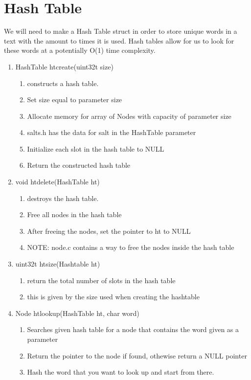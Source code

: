 \documentclass[11pt]{article}
\begin{document}
\section{Hash Table}\label{ss:Hashtable}
We will need to make a Hash Table struct in order to store unique words in a text with the amount to times it is used. Hash tables allow for us to look for these words at a potentially O(1) time complexity.
\begin{enumerate}
\item HashTable htcreate(uint32t size)
	\begin{enumerate}
	\item constructs a hash table.
	\item Set size equal to parameter size
	\item Allocate memory for array of Nodes with capacity of parameter size
	\item salts.h has the data for salt in the HashTable parameter
	\item Initialize each slot in the hash table to NULL
	\item Return the constructed hash table
	\end{enumerate}
\item void htdelete(HashTable ht)
	\begin{enumerate}
	\item destroys the hash table.
	\item Free all nodes in the hash table
	\item After freeing the nodes, set the pointer to ht to NULL
	\item NOTE: node.c contains a way to free the nodes inside the hash table
	\end{enumerate}
\item uint32t htsize(Hashtable ht)
	\begin{enumerate}
	\item return the total number of slots in the hash table
	\item this is given by the size used when creating the hashtable
	\end{enumerate}
\item Node htlookup(HashTable ht, char word)
	\begin{enumerate}
	\item Searches given hash table for a node that contains the word given as a parameter
	\item Return the pointer to the node if found, othewise return a NULL pointer
	\item Hash the word that you want to look up and start from there.

\end{enumerate}
\end{enumerate}
\end{document}
